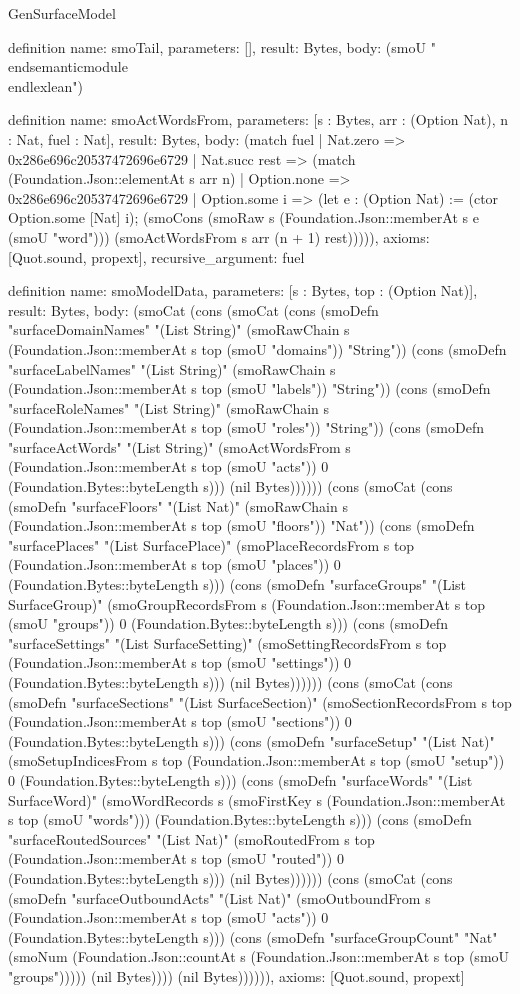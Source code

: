 \begin{lexlean}{GenSurfaceModel}
\begin{semanticmodule}
definition{
  name: smoTail,
  parameters: [],
  result: Bytes,
  body: (smoU "\\end{semanticmodule}\n\\end{lexlean}\n")
}

definition{
  name: smoActWordsFrom,
  parameters: [s : Bytes, arr : (Option Nat), n : Nat, fuel : Nat],
  result: Bytes,
  body: (match fuel
    | Nat.zero => 0x286e696c20537472696e6729
    | Nat.succ rest => (match (Foundation.Json::elementAt s arr n)
      | Option.none => 0x286e696c20537472696e6729
      | Option.some i => (let e : (Option Nat) := (ctor Option.some [Nat] i); (smoCons (smoRaw s (Foundation.Json::memberAt s e (smoU "word"))) (smoActWordsFrom s arr (n + 1) rest))))),
  axioms: [Quot.sound, propext],
  recursive_argument: fuel
}

definition{
  name: smoModelData,
  parameters: [s : Bytes, top : (Option Nat)],
  result: Bytes,
  body: (smoCat (cons (smoCat (cons (smoDefn "surfaceDomainNames" "(List String)" (smoRawChain s (Foundation.Json::memberAt s top (smoU "domains")) "String")) (cons (smoDefn "surfaceLabelNames" "(List String)" (smoRawChain s (Foundation.Json::memberAt s top (smoU "labels")) "String")) (cons (smoDefn "surfaceRoleNames" "(List String)" (smoRawChain s (Foundation.Json::memberAt s top (smoU "roles")) "String")) (cons (smoDefn "surfaceActWords" "(List String)" (smoActWordsFrom s (Foundation.Json::memberAt s top (smoU "acts")) 0 (Foundation.Bytes::byteLength s))) (nil Bytes)))))) (cons (smoCat (cons (smoDefn "surfaceFloors" "(List Nat)" (smoRawChain s (Foundation.Json::memberAt s top (smoU "floors")) "Nat")) (cons (smoDefn "surfacePlaces" "(List SurfacePlace)" (smoPlaceRecordsFrom s top (Foundation.Json::memberAt s top (smoU "places")) 0 (Foundation.Bytes::byteLength s))) (cons (smoDefn "surfaceGroups" "(List SurfaceGroup)" (smoGroupRecordsFrom s (Foundation.Json::memberAt s top (smoU "groups")) 0 (Foundation.Bytes::byteLength s))) (cons (smoDefn "surfaceSettings" "(List SurfaceSetting)" (smoSettingRecordsFrom s top (Foundation.Json::memberAt s top (smoU "settings")) 0 (Foundation.Bytes::byteLength s))) (nil Bytes)))))) (cons (smoCat (cons (smoDefn "surfaceSections" "(List SurfaceSection)" (smoSectionRecordsFrom s top (Foundation.Json::memberAt s top (smoU "sections")) 0 (Foundation.Bytes::byteLength s))) (cons (smoDefn "surfaceSetup" "(List Nat)" (smoSetupIndicesFrom s top (Foundation.Json::memberAt s top (smoU "setup")) 0 (Foundation.Bytes::byteLength s))) (cons (smoDefn "surfaceWords" "(List SurfaceWord)" (smoWordRecords s (smoFirstKey s (Foundation.Json::memberAt s top (smoU "words"))) (Foundation.Bytes::byteLength s))) (cons (smoDefn "surfaceRoutedSources" "(List Nat)" (smoRoutedFrom s top (Foundation.Json::memberAt s top (smoU "routed")) 0 (Foundation.Bytes::byteLength s))) (nil Bytes)))))) (cons (smoCat (cons (smoDefn "surfaceOutboundActs" "(List Nat)" (smoOutboundFrom s (Foundation.Json::memberAt s top (smoU "acts")) 0 (Foundation.Bytes::byteLength s))) (cons (smoDefn "surfaceGroupCount" "Nat" (smoNum (Foundation.Json::countAt s (Foundation.Json::memberAt s top (smoU "groups"))))) (nil Bytes)))) (nil Bytes)))))),
  axioms: [Quot.sound, propext]
}


\end{semanticmodule}
\end{lexlean}
